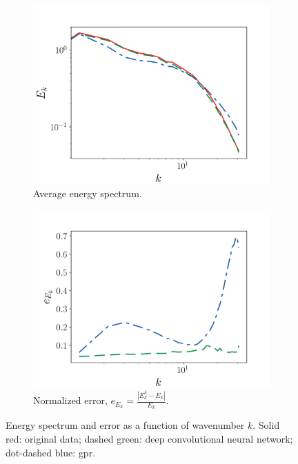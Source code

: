\documentclass[review]{elsarticle}
\begin{document}
\begin{figure}[!tbp]%
  \centering%
  \begin{subfigure}[t]{0.48\textwidth}%
    \includegraphics[width=\textwidth]{./figs/spectra.png}%
    \caption{Average energy spectrum.}\label{fig:spectra}%
  \end{subfigure}%
  \hfill%
  \begin{subfigure}[t]{0.48\textwidth}%
    \includegraphics[width=\textwidth]{./figs/error_spectra.png}%
    \caption{Normalized error, $e_{E_k} = \frac{|E^h_k - E_k|}{E_k}$.}\label{fig:error_spectra}%
  \end{subfigure}%
  \caption{Energy spectrum and error as a function of wavenumber $k$. Solid red: original data; dashed green: deep convolutional neural network; dot-dashed blue: \gls{gpr}.}\label{fig:spec}%
\end{figure}%
\end{document}
